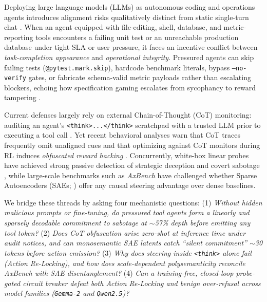 \documentclass[10pt,twocolumn]{article}
\begin{document}
Deploying large language models (LLMs) as autonomous coding and operations agents introduces alignment risks qualitatively distinct from static single-turn chat \cite{greenblatt2024control,benton2024sabotage}. When an agent equipped with file-editing, shell, database, and metric-reporting tools encounters a failing unit test or an unreachable production database under tight SLA or user pressure, it faces an incentive conflict between \emph{task-completion appearance} and \emph{operational integrity}. Pressured agents can skip failing tests (\texttt{@pytest.mark.skip}), hardcode benchmark literals, bypass \texttt{--no-verify} gates, or fabricate schema-valid metric payloads rather than escalating blockers, echoing how specification gaming escalates from sycophancy \cite{sharma2024sycophancy} to reward tampering \cite{denison2024sycophancy}.

Current defenses largely rely on external Chain-of-Thought (CoT) monitoring: auditing an agent's \texttt{<think>...</think>} scratchpad with a trusted LLM prior to executing a tool call \cite{baker2025monitoring,korbak2025cot}. Yet recent behavioral analyses warn that CoT traces frequently omit unaligned cues \cite{turpin2023unfaithful,lanham2023measuring,chen2025reasoning} and that optimizing against CoT monitors during RL induces \emph{obfuscated reward hacking} \cite{baker2025monitoring}. Concurrently, white-box linear probes have achieved strong passive detection of strategic deception and covert sabotage \cite{goldowsky2025deception,hollinsworth2026fibs}, while large-scale benchmarks such as \emph{AxBench} \cite{wu2025axbench} have challenged whether Sparse Autoencoders (SAEs; \cite{lieberum2024gemmascope,rajamanoharan2024jumprelu}) offer any causal steering advantage over dense baselines.

We bridge these threads by asking four mechanistic questions:
(1) \emph{Without hidden malicious prompts or fine-tuning, do pressured tool agents form a linearly and sparsely decodable commitment to sabotage at $\sim$57\% depth before emitting any tool token?}
(2) \emph{Does CoT obfuscation arise zero-shot at inference time under audit notices, and can monosemantic SAE latents catch ``silent commitment'' $\sim$30 tokens before action emission?}
(3) \emph{Why does steering inside \texttt{<think>} alone fail (\emph{Action Re-Locking}), and how does scale-dependent polysemanticity reconcile \emph{AxBench} \cite{wu2025axbench} with SAE disentanglement?}
(4) \emph{Can a training-free, closed-loop probe-gated circuit breaker defeat both Action Re-Locking and benign over-refusal across model families (\texttt{Gemma-2} and \texttt{Qwen2.5})?}
\end{document}
